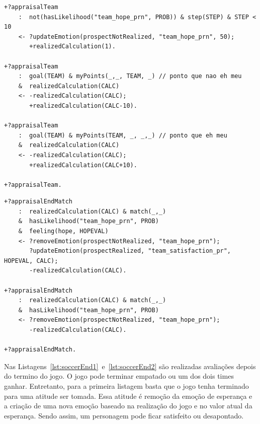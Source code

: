 \begin{center}
    \begin{minipage}{130mm}
	\lstset{linewidth=130mm}
	\begin{lstlisting}[frame=trbl,
caption=Parte do código do agente referente ao andamento do jogo,
label=lst:soccerTeam]
+?appraisalTeam
    :  not(hasLikelihood("team_hope_prn", PROB)) & step(STEP) & STEP < 10
    <- ?updateEmotion(prospectNotRealized, "team_hope_prn", 50);
       +realizedCalculation(1).

+?appraisalTeam
    :  goal(TEAM) & myPoints(_,_, TEAM, _) // ponto que nao eh meu
    &  realizedCalculation(CALC)
    <- -realizedCalculation(CALC);
       +realizedCalculation(CALC-10).

+?appraisalTeam
    :  goal(TEAM) & myPoints(TEAM, _, _,_) // ponto que eh meu
    &  realizedCalculation(CALC)
    <- -realizedCalculation(CALC);
       +realizedCalculation(CALC+10).

+?appraisalTeam.
	\end{lstlisting}
    \end{minipage}
\end{center}

\begin{center}
    \begin{minipage}{140mm}
	\lstset{linewidth=140mm}
	\begin{lstlisting}[frame=trbl,
caption=Parte do código do agente referente à avaliação do final do jogo,
label=lst:soccerEnd1]
+?appraisalEndMatch
    :  realizedCalculation(CALC) & match(_,_)
    &  hasLikelihood("team_hope_prn", PROB)
    &  feeling(hope, HOPEVAL)
    <- ?removeEmotion(prospectNotRealized, "team_hope_prn");
       ?updateEmotion(prospectRealized, "team_satisfaction_pr", HOPEVAL, CALC);
       -realizedCalculation(CALC).

+?appraisalEndMatch
    :  realizedCalculation(CALC) & match(_,_)
    &  hasLikelihood("team_hope_prn", PROB)
    <- ?removeEmotion(prospectNotRealized, "team_hope_prn");
       -realizedCalculation(CALC).

+?appraisalEndMatch.
	\end{lstlisting}
    \end{minipage}
\end{center}

Nas Listagens~\ref{lst:soccerEnd1}~e~\ref{lst:soccerEnd2} são realizadas
avaliações depois do termino do jogo. O jogo pode terminar empatado ou um dos
dois times ganhar. Entretanto, para a primeira listagem basta que o jogo tenha
terminado para uma atitude ser tomada. Essa atitude é remoção da emoção de
esperança e a criação de uma nova emoção baseado na realização do jogo e no
valor atual da esperança. Sendo assim, um personagem pode ficar satisfeito ou
desapontado.


